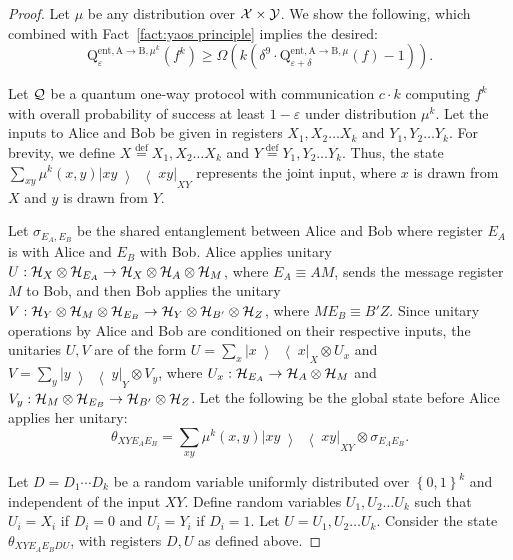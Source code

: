 \documentclass[11pt,a4paper]{article}
\def\X{\CMcal{X}}
\def\Y{\CMcal{Y}}
\def\Q{\CMcal{Q}}
\def\H{\CMcal{H}}
\theoremstyle{plain}
\theoremstyle{definition}
\newcommand {\br} [1] {\ensuremath{ \left( #1 \right) }}
\newcommand {\defeq} {\ensuremath{ \stackrel{\mathrm{def}}{=} }}
\newcommand {\ketbratwo} [2] {\ensuremath{ \left| #1 \middle\rangle \middle\langle #2 \right| }}
\newcommand {\ketbra} [1] {\ketbratwo{#1}{#1}}
\newcommand {\set} [1] {\ensuremath{ \left\lbrace #1 \right\rbrace }}
\def\ve{{\varepsilon}}
\newcommand{\dqcc}[3]{\mathrm{Q}^{\text{ent},\text{A}\rightarrow\text{B} #1}_{#2}\br{#3}}
\begin{document}
\begin{proof}
Let  $\mu$ be any distribution over $\X\times\Y$. We show the following, which combined with Fact~\ref{fact:yaos principle} implies the desired:
\[\dqcc{, \mu^k}{\ve}{f^k}\geq\Omega \br{k \br{\delta^9\cdot\dqcc{, \mu}{\ve+\delta}{f}-1}}.\]

Let $\Q$ be a quantum one-way protocol with communication $c\cdot k$ computing $f^k$  with  overall probability of success at least $1-\ve$ under distribution $\mu^k$. Let the inputs to Alice and Bob be given in registers $X_1,X_2\ldots X_k$ and $Y_1,Y_2\ldots Y_k$. For brevity, we define $X\defeq X_1,X_2\ldots X_k$ and $Y\defeq Y_1,Y_2\ldots Y_k$. Thus, the state $\sum_{xy}\mu^k(x,y)\ketbra{xy}_{XY}$ represents the joint input, where $x$ is drawn from $X$ and $y$ is drawn from $Y$.

Let $\sigma_{E_A,E_B}$ be the shared entanglement between Alice and Bob where register $E_A$ is with Alice and $E_B$ with Bob. Alice applies unitary $U:\H_X\otimes \H_{E_A}\rightarrow \H_X\otimes \H_A\otimes \H_M$, where $E_A\equiv AM$, sends the message register $M$ to Bob, and then Bob applies the unitary $V: \H_Y\otimes\H_M\otimes \H_{E_B}\rightarrow \H_Y\otimes\H_{B'}\otimes\H_Z$, where $ME_B\equiv B'Z$. Since unitary operations by Alice and Bob are conditioned on their respective inputs, the unitaries $U,V$ are  of the form $U=\sum_x\ketbra{x}_X\otimes U_x$ and $V=\sum_y\ketbra{y}_Y\otimes V_y$, where $U_x:\H_{E_A}\rightarrow \H_A\otimes \H_M$ and $V_y: \H_M\otimes \H_{E_B}\rightarrow \H_{B'}\otimes\H_Z$.
Let the following be the global state before Alice applies her unitary:
$$\theta_{XYE_AE_B} = \sum_{xy}\mu^k(x,y)\ketbra{xy}_{XY}\otimes\sigma_{E_AE_B}.$$ 

Let $D=D_1\cdots D_k$ be a random variable uniformly distributed over $\set{0,1}^k$ and independent of the input $XY$. Define random variables $U_1,U_2\ldots U_k$ such that $U_i=X_i$ if $D_i=0$ and $U_i=Y_i$ if $D_i=1$. Let $U=U_1,U_2\ldots U_k$. Consider the state $\theta_{XYE_AE_BDU}$, with registers $D,U$ as defined above.


\end{proof}
\end{document}
